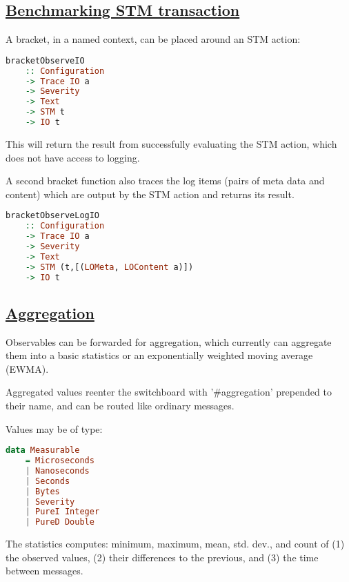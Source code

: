\begin{mdframed}

    \section*{\href{https://github.com/The-Blockchain-Company/tbco-monitoring-framework/blob/master/tbco-monitoring/src/Bcc/BM/Observer/STM.lhs}{Benchmarking STM transaction}}

A bracket, in a named context, can be placed around an STM action:

    \begin{lstlisting}[language=Haskell]
bracketObserveIO
    :: Configuration
    -> Trace IO a
    -> Severity
    -> Text
    -> STM t
    -> IO t
    \end{lstlisting}

This will return the result from successfully evaluating the STM action, which does not have access to logging.

A second bracket function also traces the log items (pairs of meta data and content) which are output by the STM action and returns its result.

    \begin{lstlisting}[language=Haskell]
bracketObserveLogIO
    :: Configuration
    -> Trace IO a
    -> Severity
    -> Text
    -> STM (t,[(LOMeta, LOContent a)])
    -> IO t
    \end{lstlisting}
\end{mdframed}

\begin{mdframed}

    \section*{\href{https://github.com/The-Blockchain-Company/tbco-monitoring-framework/blob/master/tbco-monitoring/src/Bcc/BM/Data/Aggregated.lhs}{Aggregation}}

Observables can be forwarded for aggregation, which currently can aggregate them into a basic statistics or an exponentially weighted moving average (EWMA).

Aggregated values reenter the switchboard with '\#aggregation' prepended to their name, and can be routed like ordinary messages.

Values may be of type:

    \begin{lstlisting}[language=Haskell]
data Measurable
    = Microseconds
    | Nanoseconds
    | Seconds
    | Bytes
    | Severity
    | PureI Integer
    | PureD Double
    \end{lstlisting}

The statistics computes: minimum, maximum, mean, std. dev., and count of (1) the observed values, (2) their differences to the previous, and (3) the time between messages.
\end{mdframed}

